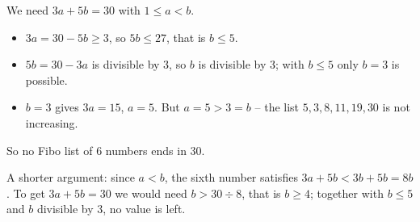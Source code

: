 {
We need $3a+5b=30$ with $1\le a<b$.
\begin{itemize}[leftmargin=1.3em,itemsep=1pt]
\item $3a=30-5b\ge 3$, so $5b\le 27$, that is $b\le 5$.
\item $5b=30-3a$ is divisible by $3$, so $b$ is divisible by $3$; with $b\le 5$ only $b=3$ is possible.
\item $b=3$ gives $3a=15$, $a=5$. But $a=5>3=b$ -- the list $5,3,8,11,19,30$ is not increasing.
\end{itemize}
So no Fibo list of $6$ numbers ends in $30$.
\begin{proofbox}A shorter argument: since $a<b$, the sixth number satisfies $3a+5b<3b+5b=8b$. To get $3a+5b=30$ we would need $b>30\div 8$, that is $b\ge 4$; together with $b\le 5$ and $b$ divisible by $3$, no value is left.\end{proofbox}
}

